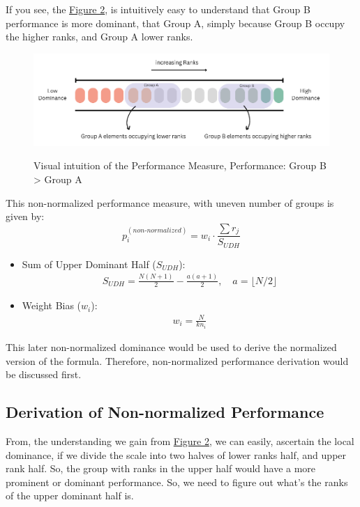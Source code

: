 \documentclass[man,floatsintext]{apa7}
\begin{document}
If you see, the \hyperref[fig:dominance_Understanding]{Figure 2}, is intuitively easy to understand that Group B performance is more dominant, that Group A, simply because Group B occupy the higher ranks, and Group A lower ranks.
\begin{figure}[!htb]
    \caption{Visual intuition of the Performance Measure, Performance: Group B > Group A}
    \centering
    \includegraphics[scale=0.65]{images/dominance-intuition.png}
    \label{fig:dominance_Understanding}
\end{figure}

This non-normalized performance measure, with uneven number of groups is given by:
\begin{equation}
\label{eq:non-normalized}
    p_i^{(non\text{-}normalized)} = w_i \cdot \frac{\sum r_j}{ S_{UDH} }
\end{equation}


\begin{itemize}
	\item Sum of Upper Dominant Half ($S_{UDH}$):
	\begin{align}
		S_{UDH} = \frac{N(N+1)}{2} - \frac{a(a+1)}{2}, \quad a = \lfloor N/2 \rfloor
	\end{align}
	\item Weight Bias ($w_i$):
	\begin{align}
		w_i = \frac{N}{k n_i}
	\end{align}
\end{itemize}

This later non-normalized dominance would be used to derive the normalized version of the formula. Therefore, non-normalized performance derivation would be discussed first.


\subsection{Derivation of Non-normalized Performance}
From, the understanding we gain from \hyperref[fig:dominance_Understanding]{Figure 2}, we can easily, ascertain the local dominance, if we divide the scale into two halves of lower ranks half, and upper rank half. So, the group with ranks in the upper half would have a more prominent or dominant performance. So, we need to figure out what's the ranks of the upper dominant half is.
\end{document}
